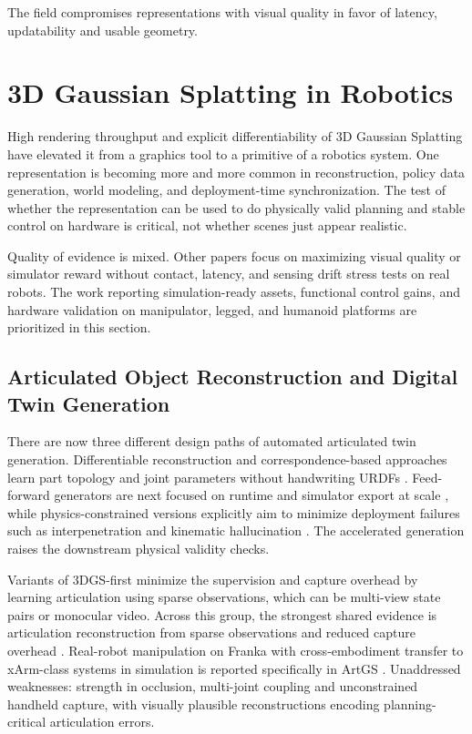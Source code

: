 \documentclass[11pt,a4paper]{article}
\begin{document}
The field compromises representations with visual quality in favor of latency, updatability and usable geometry.


\section{3D Gaussian Splatting in Robotics}
\label{sec:3dgs_robotics}

High rendering throughput and explicit differentiability of 3D Gaussian Splatting have elevated it from a graphics tool to a primitive of a robotics system. One representation is becoming more and more common in reconstruction, policy data generation, world modeling, and deployment-time synchronization. The test of whether the representation can be used to do physically valid planning and stable control on hardware is critical, not whether scenes just appear realistic.

Quality of evidence is mixed. Other papers focus on maximizing visual quality or simulator reward without contact, latency, and sensing drift stress tests on real robots. The work reporting simulation-ready assets, functional control gains, and hardware validation on manipulator, legged, and humanoid platforms are prioritized in this section.

\subsection{Articulated Object Reconstruction and Digital Twin Generation}

There are now three different design paths of automated articulated twin generation. Differentiable reconstruction and correspondence-based approaches learn part topology and joint parameters without handwriting URDFs \cite{heiden2022inferring,weng2024neural,collins2023ca2t}. Feed-forward generators are next focused on runtime and simulator export at scale \cite{li2025art,wu2025urdfanything,zhang2025simart,wang2025artllm}, while physics-constrained versions explicitly aim to minimize deployment failures such as interpenetration and kinematic hallucination \cite{xu2025motionanymesh,wang2025kinematify}. The accelerated generation raises the downstream physical validity checks.

Variants of 3DGS-first minimize the supervision and capture overhead by learning articulation using sparse observations, which can be multi-view state pairs or monocular video. Across this group, the strongest shared evidence is articulation reconstruction from sparse observations and reduced capture overhead \cite{guo2025articulatedgs,wu2025reartgs,dai2025freeartgs,chen2025freegaussian}. Real-robot manipulation on Franka with cross-embodiment transfer to xArm-class systems in simulation is reported specifically in ArtGS \cite{yu2025artgs}. Unaddressed weaknesses: strength in occlusion, multi-joint coupling and unconstrained handheld capture, with visually plausible reconstructions encoding planning-critical articulation errors.
\end{document}
